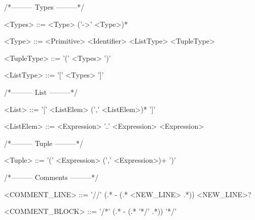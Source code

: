 /*--------- Types ---------*/
\begin{grammar}
<Types> ::= <Type> ('->' <Type>)*

<Type> ::= <Primitive>
 \alt <Identifier>
 \alt <ListType>
 \alt <TupleType>

<TupleType> ::= '(' <Types> ')'

<ListType> ::= '[' <Types> ']'
\end{grammar}
/*--------- List ---------*/
\begin{grammar}
<List> ::= '[' <ListElem> (',' <ListElem>)* ']'

<ListElem> ::= <Expression> '..' <Expression>
 \alt <Expression>
\end{grammar}
/*--------- Tuple ---------*/
\begin{grammar}
<Tuple> ::= '(' <Expression> (',' <Expression>)+ ')'
\end{grammar}
/*--------- Comments ---------*/
\begin{grammar}
  <COMMENT\_LINE> ::= '//' (.* - (.* <NEW\_LINE> .*)) <NEW\_LINE>?
\end{grammar}
\begin{grammar}
  <COMMENT\_BLOCK> ::= '/*' (.* - (.* '*/' .*)) '*/'
\end{grammar}